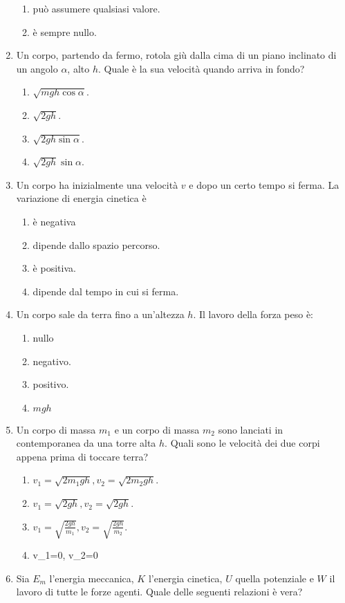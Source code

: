 \documentclass{article}
\begin{document}
\begin{enumerate}
\begin{enumerate}[label=\Alph*.]
    \item può assumere qualsiasi valore.
    \item è sempre nullo.
  \end{enumerate}
  \item Un corpo, partendo da fermo, rotola giù dalla cima di un piano inclinato di un angolo $\alpha$, alto $h$. Quale è la sua velocità quando arriva in fondo?
  \begin{enumerate}[label=\Alph*.]
    \item $\sqrt{mgh\cos\alpha}$.
    \item $\sqrt{2gh}$.
    \item $\sqrt{2gh\sin\alpha}$.
    \item $\sqrt{2gh}\sin\alpha$.
  \end{enumerate}
  \item Un corpo ha inizialmente una velocità $v$ e dopo un certo tempo si ferma. La variazione di energia cinetica è
  \begin{enumerate}[label=\Alph*.]
    \item è negativa
    \item dipende dallo spazio percorso.
    \item è positiva.
    \item dipende dal tempo in cui si ferma.
  \end{enumerate}
  \item Un corpo sale da terra fino a un'altezza $h$. Il lavoro della forza peso è:
  \begin{enumerate}[label=\Alph*.]
    \item nullo
    \item negativo.
    \item positivo.
    \item $mgh$
  \end{enumerate}
  \item Un corpo di massa $m_1$ e un corpo di massa $m_2$ sono lanciati in contemporanea da una torre alta $h$. Quali sono le velocità dei due corpi appena prima di toccare terra?
  \begin{enumerate}[label=\Alph*.]
    \item $v_1=\sqrt{2m_1gh}, v_2=\sqrt{2m_2gh}$.
    \item $v_1=\sqrt{2gh}, v_2=\sqrt{2gh}$.
    \item $v_1=\sqrt{\frac{2gh}{m_1}}, v_2=\sqrt{\frac{2gh}{m_2}}$.
    \item v_1=0, v_2=0
  \end{enumerate}
  \item Sia $E_m$ l'energia meccanica, $K$ l'energia cinetica, $U$ quella potenziale e $W$ il lavoro di tutte le forze agenti. Quale delle seguenti relazioni è vera?

\end{enumerate}
\end{document}
